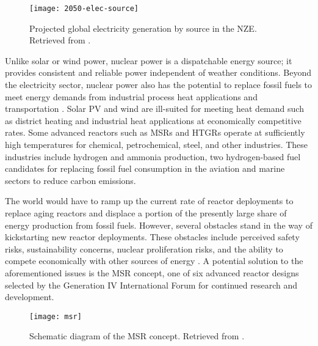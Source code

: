 \begin{figure}[htb!]
	\centering
	\texttt{[image: 2050-elec-source]}
	\caption{Projected global electricity generation by source in the
	\gls{NZE}. Retrieved from \cite{iea_net_2021}.}
	\label{fig:2050-elec-source}
\end{figure}

Unlike solar or wind power, nuclear power is a dispatchable energy source; it
provides consistent and reliable power independent of weather conditions.
Beyond the electricity sector, nuclear power also has the potential to replace
fossil fuels to meet energy demands from industrial process heat applications
and transportation \cite{forsberg_market_2020}. Solar \gls{PV} and
wind are ill-suited for meeting heat demand such as district heating and
industrial heat applications at economically competitive rates. Some advanced
reactors such as \glspl{MSR} and \glspl{HTGR} operate at sufficiently
high temperatures for chemical, petrochemical, steel, and other industries.
These industries include hydrogen and ammonia production, two hydrogen-based
fuel candidates for replacing fossil fuel consumption in the aviation and
marine sectors to reduce carbon emissions.

The world would have to ramp up the current rate of reactor deployments to
replace aging reactors and displace a portion of the presently large share of
energy production from fossil fuels. However, several obstacles stand in the
way of kickstarting new reactor deployments. These obstacles include perceived
safety risks, sustainability concerns, nuclear proliferation
risks, and the ability to compete economically with other sources of energy
\cite{massachusetts_institute_of_technology_future_2003}. A potential solution
to the aforementioned issues is the \gls{MSR} concept, one of six advanced
reactor designs selected by the Generation IV International Forum
\cite{gif_technology_2002} for continued research and development.

\begin{figure}[htb!]
	\centering
	\texttt{[image: msr]}
	\caption{Schematic diagram of the \gls{MSR} concept. Retrieved from
	\cite{doe_technology_2002}.}
	\label{fig:msr}
\end{figure}

